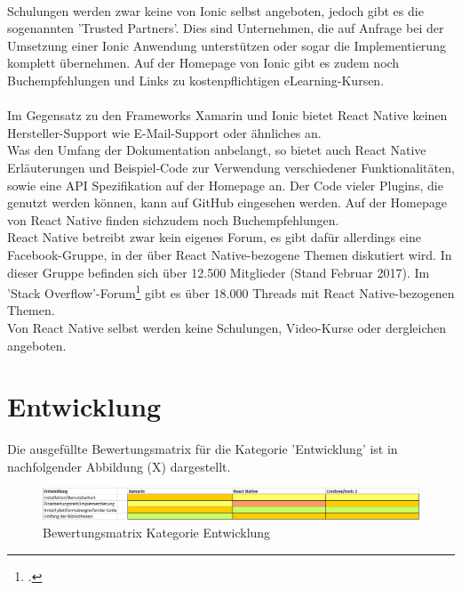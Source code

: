 \\
Schulungen werden zwar keine von Ionic selbst angeboten, jedoch gibt es die sogenannten 'Trusted Partners'. Dies sind Unternehmen, die auf Anfrage bei der Umsetzung einer Ionic Anwendung unterstützen oder sogar die Implementierung komplett übernehmen. Auf der Homepage von Ionic gibt es zudem noch Buchempfehlungen und Links zu kostenpflichtigen eLearning-Kursen.
\\
\\
Im Gegensatz zu den Frameworks Xamarin und Ionic bietet React Native keinen Hersteller-Support wie E-Mail-Support oder ähnliches an.
\\
Was den Umfang der Dokumentation anbelangt, so bietet auch React Native Erläuterungen und Beispiel-Code zur Verwendung verschiedener Funktionalitäten, sowie eine API Spezifikation auf der Homepage an. Der Code vieler Plugins, die genutzt werden können, kann auf GitHub eingesehen werden. Auf der Homepage von React Native finden sichzudem noch Buchempfehlungen.
\\
React Native betreibt zwar kein eigenes Forum, es gibt dafür allerdings eine Facebook-Gruppe, in der über React Native-bezogene Themen diskutiert wird. In dieser Gruppe befinden sich über 12.500 Mitglieder (Stand Februar 2017). Im 'Stack Overflow'-Forum\footcite{StackOverfolw} gibt es über 18.000 Threads mit React Native-bezogenen Themen. 
\\
Von React Native selbst werden keine Schulungen, Video-Kurse oder dergleichen angeboten. 

\section{Entwicklung}

Die ausgefüllte Bewertungsmatrix für die Kategorie 'Entwicklung' ist in nachfolgender Abbildung (X) dargestellt.

\begin{figure}[h]
	\centering
	\includegraphics[width=1\textwidth]{Bilder/Auswertung_Entwicklung.PNG}
	\caption{Bewertungsmatrix Kategorie Entwicklung}
	\label{fig:AuswEntw}
\end{figure}


